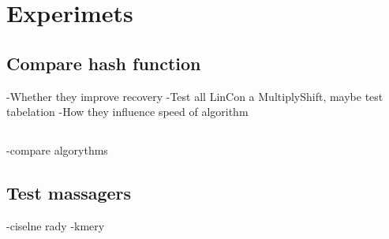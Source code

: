 \chapter{Experimets}

\section{Compare hash function}
-Whether they improve recovery
-Test all LinCon a MultiplyShift, maybe test tabelation 
-How they influence speed of algorithm

\section{}
-compare algorythms

\section{Test massagers}
-ciselne rady
-kmery